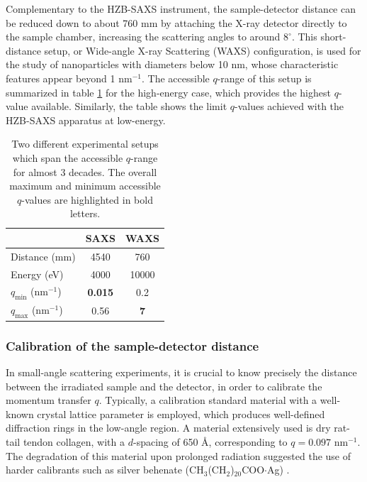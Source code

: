 Complementary to the HZB-SAXS instrument, the sample-detector distance can be reduced down to about 760 mm by attaching the X-ray detector directly to the sample chamber, increasing the scattering angles to around $8^{\circ}$. This short-distance setup, or Wide-angle X-ray Scattering (WAXS) configuration, is used for the study of nanoparticles with diameters below 10 nm, whose characteristic features appear beyond 1 nm$^{-1}$. The accessible $q$-range of this setup is summarized in table \ref{tab:qrange} for the high-energy case, which provides the highest $q$-value available. Similarly, the table shows the limit $q$-values achieved with the HZB-SAXS apparatus at low-energy.

\begin{table}[]
\centering
\caption{Two different experimental setups which span the accessible $q$-range for almost 3 decades. The overall maximum and minimum accessible $q$-values are highlighted in bold letters.}
\label{tab:qrange}
\begin{tabular}{|l|c|c|}
\hline
              & \textbf{SAXS} & \textbf{WAXS} \\ \hline
Distance (mm) & 4540          & 760           \\ \hline
Energy (eV)   & 4000          & 10000         \\ \hline
$q_{\text{min}}$ (nm$^{-1}$)   & \textbf{0.015}         & 0.2          \\ \hline
$q_{\text{max}}$ (nm$^{-1}$)   & 0.56             & \textbf{7}             \\ \hline
\end{tabular}
\end{table}

\subsubsection{Calibration of the sample-detector distance}

In small-angle scattering experiments, it is crucial to know precisely the distance between the irradiated sample and the detector, in order to calibrate the momentum transfer $q$. Typically, a calibration standard material with a well-known crystal lattice parameter is employed, which produces well-defined diffraction rings in the low-angle region. A material extensively used is dry rat-tail tendon collagen, with a $d$-spacing of 650 \AA \citep{amenitsch_performance_1997}, corresponding to $q=0.097$ nm$^{-1}$. The degradation of this material upon prolonged radiation suggested the use of harder calibrants such as silver behenate (CH$_3$(CH$_2$)$_{20}$COO$\cdot$Ag) \citep{huang_x-ray_1993}.

